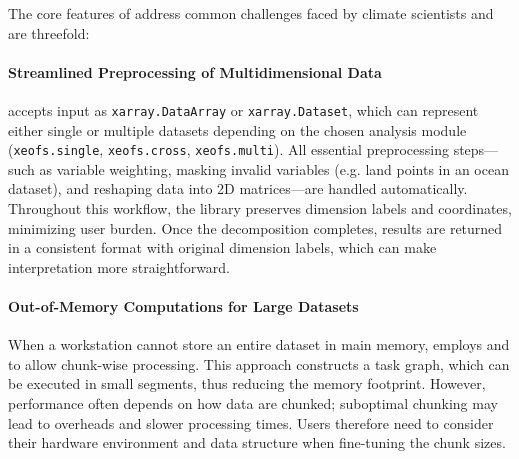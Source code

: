 The core features of  address common challenges faced by climate scientists and are threefold:

\paragraph{Streamlined Preprocessing of Multidimensional Data}
 accepts input as \texttt{xarray.DataArray} or \texttt{xarray.Dataset}, which can represent either single or multiple datasets depending on the chosen analysis module (\texttt{xeofs.single}, \texttt{xeofs.cross}, \texttt{xeofs.multi}). All essential preprocessing steps---such as variable weighting, masking invalid variables (e.g. land points in an ocean dataset), and reshaping data into 2D matrices---are handled automatically. Throughout this workflow, the library preserves dimension labels and coordinates, minimizing user burden. Once the decomposition completes, results are returned in a consistent format with original dimension labels, which can make interpretation more straightforward.

\paragraph{Out-of-Memory Computations for Large Datasets} When a workstation cannot store an entire dataset in main memory,  employs  and  to allow chunk-wise processing. This approach constructs a task graph, which can be executed in small segments, thus reducing the memory footprint. However, performance often depends on how data are chunked; suboptimal chunking may lead to overheads and slower processing times. Users therefore need to consider their hardware environment and data structure when fine-tuning the chunk sizes.

